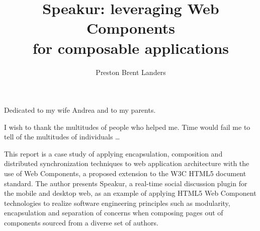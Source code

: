 \documentclass[12pt]{report}	%
\author{Preston Brent Landers}  	%
\title{Speakur: leveraging Web Components \\ for composable applications}
\theoremstyle{definition}
\theoremstyle{remark}
\begin{document}
\copyrightpage          %


%
%
%
\commcertpage           %

\titlepage              %



%
\begin{dedication}
%
Dedicated to my wife Andrea and to my parents.
\end{dedication}


\begin{acknowledgments}		%
%
I wish to thank the multitudes of people who helped me. Time would
fail me to tell of the multitudes of individuals \ldots
\end{acknowledgments}


%
\utabstract
{}%
\indent

This report is a case study of applying encapsulation, composition and distributed synchronization techniques to web application architecture with the use of Web Components, a proposed extension to the W3C HTML5 document standard. 
The author presents Speakur, a real-time social discussion plugin for the mobile and desktop web, as an example of applying HTML5 Web Component technologies to realize software engineering principles such as modularity, encapsulation and separation of concerns when composing pages out of components sourced from a diverse set of authors.
\end{document}
